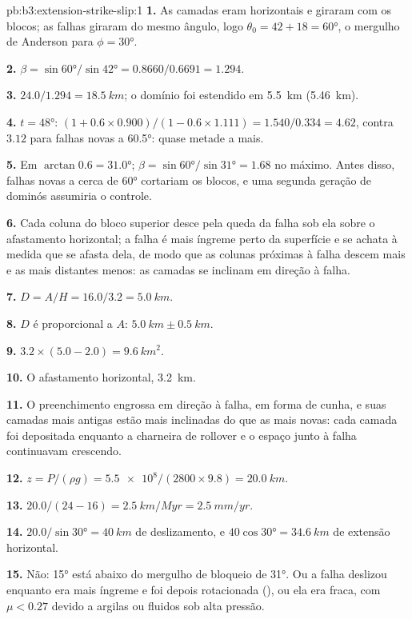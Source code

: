 \begin{solution}{pb:b3:extension-strike-slip:1}
\textbf{1.} As camadas eram horizontais e giraram com os blocos; as
falhas giraram do mesmo ângulo, logo $\theta_0 = 42 + 18 = \ang{60}$,
o mergulho de Anderson para $\phi = \ang{30}$.

\textbf{2.} $\beta = \sin\ang{60}/\sin\ang{42} = 0.8660/0.6691 = 1.294$.

\textbf{3.} $24.0/1.294 = \qty{18.5}{km}$; o domínio foi estendido em
\qty{5.5}{km} (\qty{5.46}{km}).

\textbf{4.} $t = \ang{48}$: $(1 + 0.6\times0.900)/(1 - 0.6\times1.111) =
1.540/0.334 = 4.62$, contra $3.12$ para falhas novas a \ang{60.5}: quase
metade a mais.

\textbf{5.} Em $\arctan0.6 = \ang{31.0}$; $\beta = \sin\ang{60}/\sin\ang{31}
= 1.68$ no máximo. Antes disso, falhas novas a cerca de \ang{60} cortariam
os blocos, e uma segunda geração de dominós assumiria o controle.

\textbf{6.} Cada coluna do bloco superior desce pela queda da falha sob ela sobre o
afastamento horizontal; a falha é mais íngreme perto da superfície e se achata
à medida que se afasta dela, de modo que as colunas próximas à falha descem mais e as mais distantes
menos: as camadas se inclinam em direção à falha.

\textbf{7.} $D = A/H = 16.0/3.2 = \qty{5.0}{km}$.

\textbf{8.} $D$ é proporcional a $A$: $\qty{5.0}{km} \pm \qty{0.5}{km}$.

\textbf{9.} $3.2\times(5.0 - 2.0) = \qty{9.6}{km^2}$.

\textbf{10.} O afastamento horizontal, \qty{3.2}{km}.

\textbf{11.} O preenchimento engrossa em direção à falha, em forma de cunha, e suas
camadas mais antigas estão mais inclinadas do que as mais novas: cada camada foi depositada enquanto
a charneira de rollover e o espaço junto à falha continuavam crescendo.

\textbf{12.} $z = P/(\rho g) = \num{5.5e8}/(2800\times9.8) = \qty{20.0}{km}$.

\textbf{13.} $20.0/(24 - 16) = \qty{2.5}{km/Myr} = \qty{2.5}{mm/yr}$.

\textbf{14.} $20.0/\sin\ang{30} = \qty{40}{km}$ de deslizamento, e $40\cos\ang{30} =
\qty{34.6}{km}$ de extensão horizontal.

\textbf{15.} Não: \ang{15} está abaixo do mergulho de bloqueio de \ang{31}. Ou a
falha deslizou enquanto era mais íngreme e foi depois rotacionada (), ou
ela era fraca, com $\mu < 0.27$ devido a argilas ou fluidos sob alta pressão.


\end{solution}
